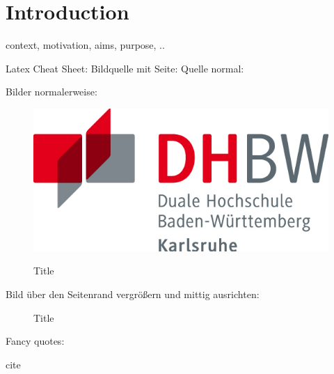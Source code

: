 \chapter{Introduction}
\label{ch:einleitung}

context, motivation, aims, purpose, ..

Latex Cheat Sheet:
Bildquelle mit Seite:%
Quelle normal: %

Bilder normalerweise:
\begin{figure}[htbp] 
	\centering
	\includegraphics[width=1.0\textwidth]{logos/dhbwLogo.png}
	\caption{Title}
	\cite{bibkey}
	\label{fig:label01}
\end{figure}
Bild über den Seitenrand vergrößern und mittig ausrichten:
\begin{figure}[htbp] 
	\centering
	\caption{Title}
	\cite{bibkey}
	\label{fig:labelName}
\end{figure}

Fancy quotes:
\begin{fquote}
	cite
\end{fquote}

